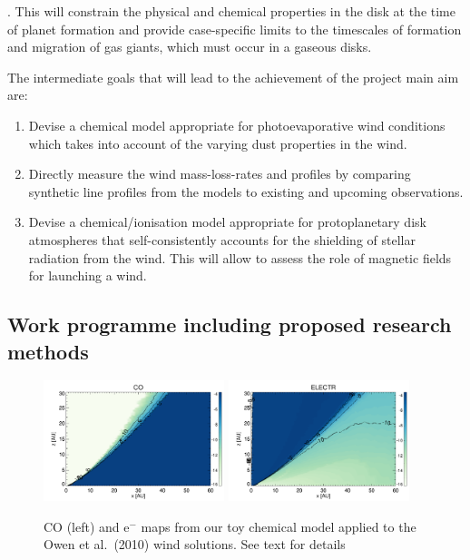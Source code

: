 \documentclass[10pt,fleqn,twoside]{article}
\begin{document}
. This will constrain the physical and chemical properties in the disk at the time of planet formation and provide case-specific limits to the timescales of formation and migration of gas giants, which must occur in a gaseous disks. 

The intermediate goals that will lead to the achievement of the project main aim are: 

\begin{enumerate}

\item Devise a chemical model appropriate for photoevaporative wind conditions which takes into account of the varying dust properties in the wind. 
\item Directly measure the wind mass-loss-rates and profiles by
  comparing synthetic line profiles from the models to existing and upcoming observations.
\item Devise a chemical/ionisation model appropriate for
  protoplanetary disk atmospheres that self-consistently accounts for
  the shielding of stellar radiation from the wind. This will allow to
  assess the role of magnetic fields for launching a wind.
\end{enumerate}

\subsection{Work programme including proposed research methods}

 \begin{figure}
   \centering
   \includegraphics[width=0.47\textwidth]{Lx_2e29_CO.pdf}
   \includegraphics[width=0.47\textwidth]{Lx_2e29_ELECTR.pdf}
   \caption{CO (left) and e$^-$ maps from our toy chemical model
     applied to the Owen et al.\ (2010) wind solutions. See text for details
}
              \label{fig:chem}%
    \end{figure}
\end{document}
